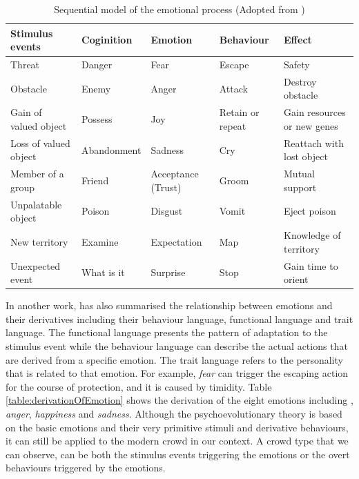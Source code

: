\begin{table}[htb!]
\caption{Sequential model of the emotional process (Adopted from \citet{plutchik2001integration})}
\label{table:sequentialModelOfEmotion}
\centering
\begin{tabular}{|p{2.5cm}|p{2.3cm}|p{2.3cm}|p{2.3cm}|p{3.5cm}|}
\hline
\textbf{Stimulus events} & \textbf{Coginition} & \textbf{Emotion} & \textbf{Behaviour} & \textbf{Effect} \\ \hline \hline
Threat & Danger & Fear & Escape & Safety \\ \hline
Obstacle & Enemy & Anger & Attack & Destroy obstacle \\ \hline
Gain of valued object & Possess & Joy & Retain or repeat & Gain resources or new genes \\ \hline
Loss of valued object & Abandonment & Sadness & Cry & Reattach with lost object \\ \hline
Member of a group & Friend & Acceptance (Trust) & Groom & Mutual support \\ \hline
Unpalatable object & Poison & Disgust & Vomit & Eject poison \\ \hline
New territory & Examine & Expectation & Map & Knowledge of territory \\ \hline
Unexpected event & What is it & Surprise & Stop & Gain time to orient \\ \hline
\end{tabular}
\end{table}

In another work, \citet{plutchik2001integration} has also summarised the relationship between emotions and their derivatives including their behaviour language, functional language and trait language. The functional language presents the pattern of adaptation to the stimulus event while the behaviour language can describe the actual actions that are derived from a specific emotion. The trait language refers to the personality that is related to that emotion. For example, \textit{fear} can trigger the escaping action for the course of protection, and it is caused by timidity. Table \ref{table:derivationOfEmotion} shows the derivation of the eight emotions including , \textit{anger}, \textit{happiness} and \textit{sadness}. Although the psychoevolutionary theory is based on the basic emotions and their very primitive stimuli and derivative behaviours, it can still be applied to the modern crowd in our context. A crowd type that we can observe, can be both the stimulus events triggering the emotions or the overt behaviours triggered by the emotions. 

